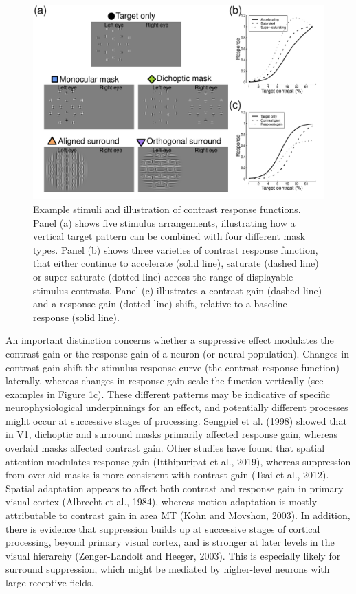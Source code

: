\documentclass[]{article}
\begin{document}
\begin{figure}

{\centering \includegraphics{figures/stimfig} 

}

\caption{Example stimuli and illustration of contrast response functions. Panel (a) shows five stimulus arrangements, illustrating how a vertical target pattern can be combined with four different mask types. Panel (b) shows three varieties of contrast response function, that either continue to accelerate (solid line), saturate (dashed line) or super-saturate (dotted line) across the range of displayable stimulus contrasts. Panel (c) illustrates a contrast gain (dashed line) and a response gain (dotted line) shift, relative to a baseline response (solid line).}\label{fig:stimfig}
\end{figure}

An important distinction concerns whether a suppressive effect modulates the contrast gain or the response gain of a neuron (or neural population). Changes in contrast gain shift the stimulus-response curve (the contrast response function) laterally, whereas changes in response gain scale the function vertically (see examples in Figure \ref{fig:stimfig}c). These different patterns may be indicative of specific neurophysiological underpinnings for an effect, and potentially different processes might occur at successive stages of processing. Sengpiel et al. (1998) showed that in V1, dichoptic and surround masks primarily affected response gain, whereas overlaid masks affected contrast gain. Other studies have found that spatial attention modulates response gain (Itthipuripat et al., 2019), whereas suppression from overlaid masks is more consistent with contrast gain (Tsai et al., 2012). Spatial adaptation appears to affect both contrast and response gain in primary visual cortex (Albrecht et al., 1984), whereas motion adaptation is mostly attributable to contrast gain in area MT (Kohn and Movshon, 2003). In addition, there is evidence that suppression builds up at successive stages of cortical processing, beyond primary visual cortex, and is stronger at later levels in the visual hierarchy (Zenger-Landolt and Heeger, 2003). This is especially likely for surround suppression, which might be mediated by higher-level neurons with large receptive fields.
\end{document}

